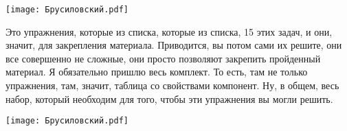 \documentclass[main.tex]{subfiles}
\begin{document}
\begin{center}
\texttt{[image: Брусиловский.pdf]}
\end{center}

Это упражнения, которые из списка, которые из списка, 15 этих задач, и они, значит, для закрепления материала.
Приводится, вы потом сами их решите, они все совершенно не сложные, они просто позволяют закрепить пройденный материал.
Я обязательно пришлю весь комплект.
То есть, там не только упражнения, там, значит, таблица со свойствами компонент.
Ну, в общем, весь набор, который необходим для того, чтобы эти упражнения вы могли решить.

\begin{center}
\texttt{[image: Брусиловский.pdf]}
\end{center}
\end{document}
